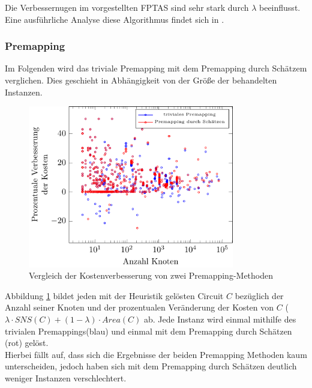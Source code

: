 \documentclass[11pt, a4paper, german]{article}
\begin{document}
Die Verbessernugen im vorgestellten FPTAS sind sehr stark durch $\lambda$ beeinflusst. Eine ausf\"uhrliche Analyse diese Algorithmus findet sich in \cite{Elbert}.


\subsubsection{Premapping}
Im Folgenden wird das triviale Premapping mit dem Premapping durch Sch\"atzem verglichen. Dies geschieht in Abh\"angigkeit von der Gr\"o{\ss}e der behandelten Instanzen. \\
\begin{figure}[h]
		\centering
		\includegraphics[width = 9cm]{pictures/tex_files/analysis/prem_test}
		\caption{Vergleich der Kostenverbesserung von zwei Premapping-Methoden}
		\label{bild:prem_test}
\end{figure}

Abbildung \ref{bild:prem_test} bildet jeden mit der Heuristik gel\"osten Circuit $C$ bez\"uglich der Anzahl seiner Knoten und der prozentualen Ver\"anderung der Kosten von $C$ ($\lambda \cdot SNS(C) + (1-\lambda) \cdot Area(C)$ ab. Jede Instanz wird einmal mithilfe des trivialen Premappings(blau) und einmal mit dem Premapping durch Sch\"atzen (rot) gel\"ost.\\
Hierbei f\"allt auf, dass sich die Ergebnisse der beiden Premapping Methoden kaum unterscheiden, jedoch haben sich mit dem Premapping durch Sch\"atzen deutlich weniger Instanzen verschlechtert. \\
\end{document}
